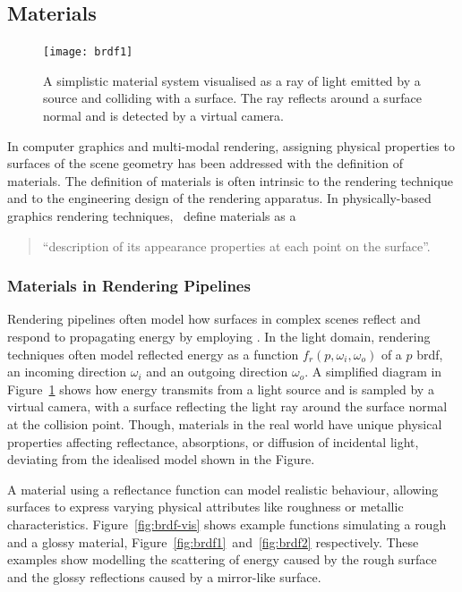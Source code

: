\subsection{Materials}
\begin{figure}
    \centering
    \texttt{[image: brdf1]}
    \caption{A simplistic material system visualised as a ray of light emitted by a source and colliding with a surface. The ray reflects around a surface normal and is detected by a virtual camera.}\label{fig:material-vis}
\end{figure}
In computer graphics and multi-modal rendering, assigning physical properties to surfaces of the scene geometry has been addressed with the definition of materials. The definition of materials is often intrinsic to the rendering technique and to the engineering design of the rendering apparatus. In physically-based graphics rendering techniques,~\cite{pharr2023physically} define materials as a
\begin{quotation}
    ``description of its appearance properties at each point on the surface''.
\end{quotation}
\subsubsection{Materials in Rendering Pipelines}
Rendering pipelines often model how surfaces in complex scenes reflect and respond to propagating energy by employing . In the light domain, rendering techniques often model reflected energy as a function $f_r(p, \omega_i, \omega_o)$ of a $p$ \acrshort{brdf}, an incoming direction $\omega_i$ and an outgoing direction $\omega_o$. A simplified diagram in Figure~\ref{fig:material-vis} shows how energy transmits from a light source and is sampled by a virtual camera, with a surface reflecting the light ray around the surface normal at the collision point. Though, materials in the real world have unique physical properties affecting reflectance, absorptions, or diffusion of incidental light, deviating from the idealised model shown in the Figure.\par
A material using a reflectance function can model realistic behaviour, allowing surfaces to express varying physical attributes like roughness or metallic characteristics. Figure~\ref{fig:brdf-vis} shows example functions simulating a rough and a glossy material, Figure~\ref{fig:brdf1}~and~\ref{fig:brdf2} respectively. These examples show  modelling the scattering of energy caused by the rough surface and the glossy reflections caused by a mirror-like surface.\par
